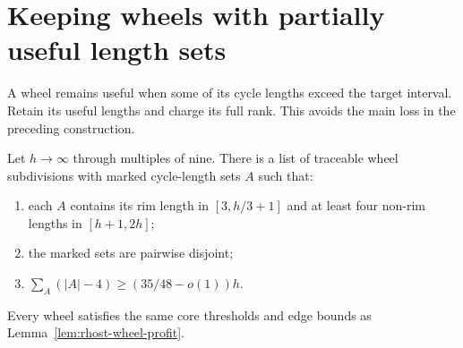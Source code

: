 \section{Keeping wheels with partially useful length sets}
\label{sec:rhost-one-fifty-one}

A wheel remains useful when some of its cycle lengths exceed the target interval.
Retain its useful lengths and charge its full rank.
This avoids the main loss in the preceding construction.

\begin{lemma}\label{lem:rhost-partial-wheels}
Let $h\to\infty$ through multiples of nine.
There is a list of traceable wheel subdivisions with marked cycle-length sets $A$ such that:
\begin{enumerate}
\item each $A$ contains its rim length in $[3,h/3+1]$ and at least four non-rim lengths in $[h+1,2h]$;
\item the marked sets are pairwise disjoint;
\item $\sum_A(|A|-4)\ge(35/48-o(1))h$.
\end{enumerate}
Every wheel satisfies the same core thresholds and edge bounds as Lemma~\ref{lem:rhost-wheel-profit}.
\end{lemma}

